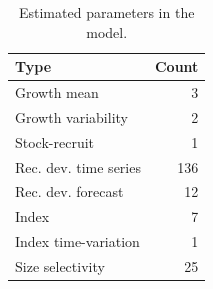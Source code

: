 \documentclass[
]{scrartcl}
\begin{document}
\endgroup

\newpage{}

\begingroup
\fontsize{9.0pt}{10.8pt}\selectfont

\begin{longtable}{lr}

\caption{\label{tbl-n-param}Estimated parameters in the model.}

\tabularnewline

\toprule
Type & Count \\ 
\midrule\addlinespace[2.5pt]
Growth mean & 3 \\ 
Growth variability & 2 \\ 
Stock-recruit & 1 \\ 
Rec. dev. time series & 136 \\ 
Rec. dev. forecast & 12 \\ 
Index & 7 \\ 
Index time-variation & 1 \\ 
Size selectivity & 25 \\ 
\bottomrule

\end{longtable}

\endgroup

\newpage{}
\end{document}
